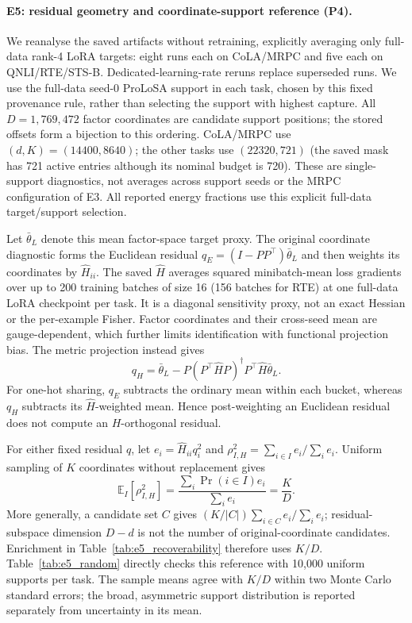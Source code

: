 \paragraph{E5: residual geometry and coordinate-support reference (P4).}
We reanalyse the saved artifacts without retraining, explicitly averaging only full-data rank-4 LoRA targets: eight runs each on CoLA/MRPC and five each on QNLI/RTE/STS-B. Dedicated-learning-rate reruns replace superseded runs. We use the full-data seed-0 ProLoSA support in each task, chosen by this fixed provenance rule, rather than selecting the support with highest capture. All $D=1{,}769{,}472$ factor coordinates are candidate support positions; the stored offsets form a bijection to this ordering. CoLA/MRPC use $(d,K)=(14400,8640)$; the other tasks use $(22320,721)$ (the saved mask has 721 active entries although its nominal budget is 720). These are single-support diagnostics, not averages across support seeds or the MRPC configuration of E3. All reported energy fractions use this explicit full-data target/support selection.

Let $\bar\theta_L$ denote this mean factor-space target proxy. The original coordinate diagnostic forms the Euclidean residual
$q_E=(I-PP^\top)\bar\theta_L$ and then weights its coordinates by $\hat H_{ii}$.
The saved $\hat H$ averages squared minibatch-mean loss gradients over up to 200 training batches of size 16 (156 batches for RTE) at one full-data LoRA checkpoint per task. It is a diagonal sensitivity proxy, not an exact Hessian or the per-example Fisher. Factor coordinates and their cross-seed mean are gauge-dependent, which further limits identification with functional projection bias.
The metric projection instead gives
\begin{equation}
 q_H=\bar\theta_L-P(P^\top\hat H P)^\dagger P^\top\hat H\bar\theta_L.
\end{equation}
For one-hot sharing, $q_E$ subtracts the ordinary mean within each bucket, whereas $q_H$ subtracts its $\hat H$-weighted mean. Hence post-weighting an Euclidean residual does not compute an $H$-orthogonal residual.

For either fixed residual $q$, let $e_i=\hat H_{ii}q_i^2$ and $\rho_{I,H}^2=\sum_{i\in I}e_i/\sum_i e_i$. Uniform sampling of $K$ coordinates without replacement gives
\begin{equation}
 \mathbb E_I[\rho_{I,H}^2]
 =\frac{\sum_i\Pr(i\in I)e_i}{\sum_i e_i}=\frac KD.
\end{equation}
More generally, a candidate set $C$ gives $(K/|C|)\sum_{i\in C}e_i/\sum_i e_i$; residual-subspace dimension $D-d$ is not the number of original-coordinate candidates. Enrichment in Table~\ref{tab:e5_recoverability} therefore uses $K/D$. Table~\ref{tab:e5_random} directly checks this reference with 10,000 uniform supports per task. The sample means agree with $K/D$ within two Monte Carlo standard errors; the broad, asymmetric support distribution is reported separately from uncertainty in its mean.

